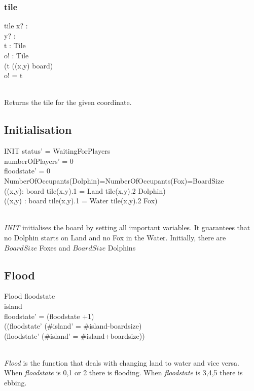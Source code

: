 \documentclass[a4paper,twoside,11pt]{book}
\begin{document}
\subsubsection{tile} %
\label{ssub:tile}
\begin{schema}{tile}
    x? :  \\
    y? :  \\
    t : Tile \\
    o! : Tile  \\
    \ST
    (t \in \ran ((x,y) \triangleleft board) \\
    o! = t \\
\end{schema}\\
Returns the tile for the given coordinate.



\subsection{Initialisation} %
\label{sub:initialisation}
\begin{schema}{INIT}
    status' = WaitingForPlayers \\
    numberOfPlayers' = 0 \\
    floodstate' = 0\\
    NumberOfOccupants(Dolphin)=NumberOfOccupants(Fox)=BoardSize \\
    (\forall (x,y): \dom board \bullet tile(x,y).1 = Land \Rightarrow tile(x,y).2 \neq Dolphin)\\
    (\forall (x,y) : \dom board \bullet tile(x,y).1 = Water \Rightarrow tile(x,y).2 \neq Fox)\\
\end{schema}\\
\emph{INIT} initialises the board by setting all important variables. It guarantees that no Dolphin starts on Land and no Fox in the Water. Initially, there are $BoardSize$ Foxes and $BoardSize$ Dolphins


\subsection{Flood} %
\label{sub:flood}
\begin{schema}{Flood}
    \Delta floodstate \\
    \Delta island \\
    \ST
    floodstate' = (floodstate +1)  \\
    ((floodstate'  \wedge (\#island' = \#island-boardsize) \vee \\
    (floodstate'  \wedge (\#island' = \#island+boardsize))
\end{schema} \\
\emph{Flood} is the function that deals with changing land to water and vice versa. When \emph{floodstate} is 0,1 or 2 there is flooding. When \emph{floodstate} is 3,4,5 there is ebbing.
\end{document}
